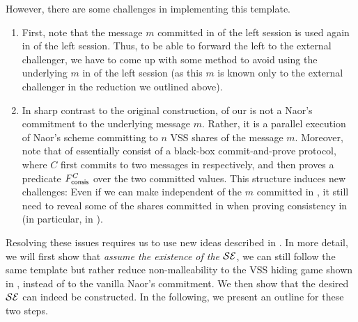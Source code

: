 However, there are some challenges in implementing this template. 
\begin{enumerate}
    \item
    First, note that the message $m$ committed in  of the left session is used again in  of the left session. Thus, to be able to forward the left  to the external challenger, we have to come up with some method to avoid using the underlying $m$ in  of the left session (as this $m$ is known only to the external challenger in the reduction we outlined above).
    \item
    In sharp contrast to the original \cite{FOCS:LPY23} construction,  of our  is not a Naor's commitment to the underlying message $m$. Rather, it is a parallel execution of Naor's scheme committing to $n$ VSS shares of the message $m$.     Moreover, note that  of  essentially consist of a black-box commit-and-prove protocol, where $C$ first commits to two messages in  respectively, and then proves a predicate $F^C_{\mathsf{consis}}$ over the two committed values. This structure induces new challenges: Even if we can make  independent of the $m$ committed in , it still need to reveal some of the shares committed in  when proving consistency in  (in particular, in ). 
\end{enumerate}
Resolving these issues requires us to use new ideas described in . In more detail, we will first show that {\em assume the existence of the $\mathcal{SE}$}, we can still follow the same template but rather reduce non-malleability to the VSS hiding game shown in , instead of to the vanilla Naor's commitment. We then show that the desired $\mathcal{SE}$ can indeed be constructed. In the following, we present an outline for these two steps.

